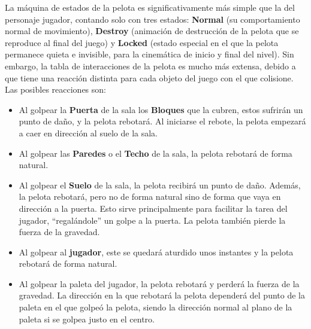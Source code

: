 La máquina de estados de la pelota es significativamente más simple que la del personaje jugador, contando solo con tres estados: \textbf{Normal} (su comportamiento normal de movimiento), \textbf{Destroy} (animación de destrucción de la pelota que se reproduce al final del juego) y \textbf{Locked} (estado especial en el que la pelota permanece quieta e invisible, para la cinemática de inicio y final del nivel).  Sin embargo, la tabla de interacciones de la pelota es mucho más extensa, debido a que tiene una reacción distinta para cada objeto del juego con el que colisione. Las posibles reacciones son:
\begin{itemize}
	\item Al golpear la \textbf{Puerta} de la sala los \textbf{Bloques} que la cubren, estos sufrirán un punto de daño, y la pelota rebotará. Al iniciarse el rebote, la pelota empezará a caer en dirección al suelo de la sala.
	\item Al golpear las \textbf{Paredes} o el \textbf{Techo} de la sala, la pelota rebotará de forma natural.
	\item Al golpear el \textbf{Suelo} de la sala, la pelota recibirá un punto de daño. Además, la pelota rebotará, pero no de forma natural sino de forma que vaya en dirección a la puerta. Esto sirve principalmente para facilitar la tarea del jugador, ``regalándole'' un golpe a la puerta. La pelota también pierde la fuerza de la gravedad.
	\item Al golpear al \textbf{jugador}, este se quedará aturdido unos instantes y la pelota rebotará de forma natural.
	\item Al golpear la paleta del jugador, la pelota rebotará y perderá la fuerza de la gravedad. La dirección en la que rebotará la pelota dependerá del punto de la paleta en el que golpeó la pelota, siendo la dirección normal al plano de la paleta si se golpea justo en el centro.
\end{itemize}
